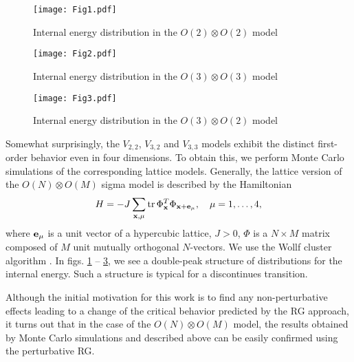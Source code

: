 \documentclass[final,twocolumn]{elsarticle}
\begin{document}
\begin{figure}[t]
    \center
    \texttt{[image: Fig1.pdf]}%
    \caption{\label{fig1} Internal energy distribution in the $O(2)\otimes O(2)$ model}
\end{figure}%
\begin{figure}[t]
    \center
    \texttt{[image: Fig2.pdf]}%
    \caption{\label{fig2} Internal energy distribution in the $O(3)\otimes O(3)$ model}
\end{figure}%
\begin{figure}[t]
    \center
    \texttt{[image: Fig3.pdf]}%
    \caption{\label{fig3} Internal energy distribution in the $O(3)\otimes O(2)$ model}
\end{figure}%
Somewhat surprisingly, the $V_{2,2}$, $V_{3,2}$ and $V_{3,3}$ models exhibit the distinct first-order behavior even in four dimensions. To obtain this, we perform Monte Carlo simulations of the corresponding lattice models. Generally, the lattice version of the $O(N)\otimes O(M)$ sigma model is described by the Hamiltonian \cite{Kunz93}
\begin{equation}
    H=-J\sum_{\mathbf{x},\mu}\mathrm{tr}\,\Phi_{\mathbf{x}}^T\Phi_{\mathbf{x}+\mathbf{e}_\mu},\quad \mu=1,\ldots,4,
    \label{lattice-model}
\end{equation}
where $\mathbf{e}_\mu$ is a unit vector of a hypercubic lattice, $J>0$, $\Phi$ is a $N\times M$ matrix composed of $M$ unit mutually orthogonal $N$-vectors. We use the Wollf cluster algorithm \cite{Wollf89}. In figs. \ref{fig1} -- \ref{fig3}, we see a double-peak structure of distributions for the internal energy. Such a structure is typical for a discontinues transition.

Although the initial motivation for this work is to find any non-perturbative effects leading to a change of the critical behavior predicted by the RG approach, it turns out that in the case of the $O(N)\otimes O(M)$ model, the results obtained by Monte Carlo simulations and described above can be easily confirmed using the perturbative RG.
\end{document}
